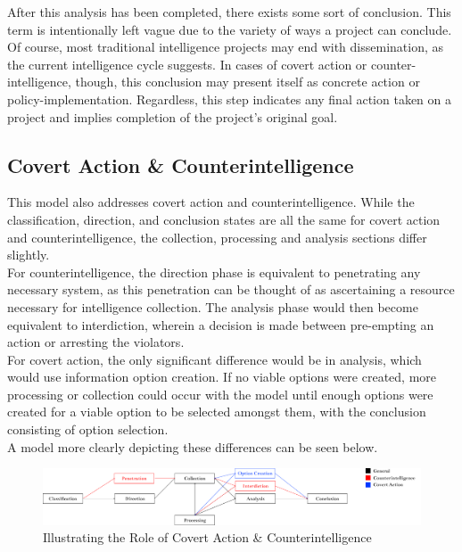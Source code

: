 \documentclass[10pt, letterpaper]{article}
\begin{document}
After this analysis has been completed, there exists some sort of conclusion. This term is intentionally left vague due to the variety of ways a project can conclude. Of course, most traditional intelligence projects may end with dissemination, as the current intelligence cycle suggests. In cases of covert action or counter-intelligence, though, this conclusion may present itself as concrete action or policy-implementation. Regardless, this step indicates any final action taken on a project and implies completion of the project's original goal.

\subsection{Covert Action \& Counterintelligence}
This model also addresses covert action and counterintelligence. While the classification, direction, and conclusion states are all the same for covert action and counterintelligence, the collection, processing and analysis sections differ slightly. \\

For counterintelligence, the direction phase is equivalent to penetrating any necessary system, as this penetration can be thought of as ascertaining a resource necessary for intelligence collection. The analysis phase would then become equivalent to interdiction, wherein a decision is made between pre-empting an action or arresting the violators. \\

For covert action, the only significant difference would be in analysis, which would use information option creation. If no viable options were created, more processing or collection could occur with the model until enough options were created for a viable option to be selected amongst them, with the conclusion consisting of option selection. \\

A model more clearly depicting these differences can be seen below. \\

\begin{figure} [h!]
    \centering
    \includegraphics[scale = 0.25]{Model2.pdf} 
    \caption{Illustrating the Role of Covert Action \& Counterintelligence}
    \label{Not Your Father's Intelligence Model}
\end{figure}
\end{document}
